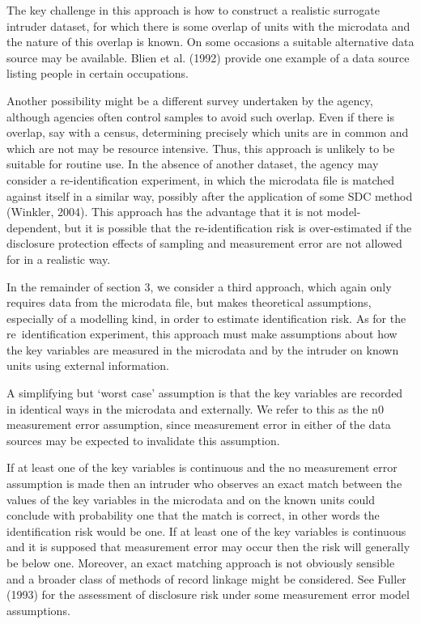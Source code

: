 The key challenge in this approach is how to construct a realistic surrogate intruder
dataset, for which there is some overlap of units with the microdata and the nature of this
overlap is known. On some occasions a suitable alternative data source may be available.
Blien et al. (1992) provide one example of a data source listing people in certain
occupations. 

Another possibility might be a different survey undertaken by the agency,
although agencies often control samples to avoid such overlap. Even if there is overlap,
say with a census, determining precisely which units are in common and which are not
may be resource intensive. Thus, this approach is unlikely to be suitable for routine use.
In the absence of another dataset, the agency may consider a re-identification
experiment, in which the microdata file is matched against itself in a similar way,
possibly after the application of some SDC method (Winkler, 2004). This approach has
the advantage that it is not model-dependent, but it is possible that the re-identiﬁcation
risk is over-estimated if the disclosure protection effects of sampling and measurement
error are not allowed for in a realistic way.

In the remainder of section 3, we consider a third approach, which again only
requires data from the microdata ﬁle, but makes theoretical assumptions, especially of a
modelling kind, in order to estimate identiﬁcation risk. As for the re~identiﬁcation
experiment, this approach must make assumptions about how the key variables are
measured in the microdata and by the intruder on known units using external information.

A simplifying but ‘worst case’ assumption is that the key variables are recorded in
identical ways in the microdata and externally. We refer to this as the n0 measurement
error assumption, since measurement error in either of the data sources may be expected
to invalidate this assumption. 

If at least one of the key variables is continuous and the no
measurement error assumption is made then an intruder who observes an exact match
between the values of the key variables in the microdata and on the known units could
conclude with probability one that the match is correct, in other words the identification
risk would be one. If at least one of the key variables is continuous and it is supposed that
measurement error may occur then the risk will generally be below one. Moreover, an
exact matching approach is not obviously sensible and a broader class of methods of
record linkage might be considered. See Fuller (1993) for the assessment of disclosure
risk under some measurement error model assumptions.

